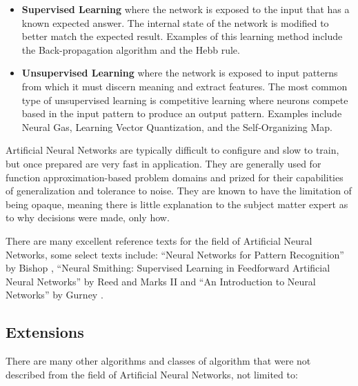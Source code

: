 \begin{bibunit}
\begin{itemize}
	\item \textbf{Supervised Learning} where the network is exposed to the input that has a known expected answer. The internal state of the network is modified to better match the expected result. Examples of this learning method include the Back-propagation algorithm and the Hebb rule.
	\item \textbf{Unsupervised Learning} where the network is exposed to input patterns from which it must discern meaning and extract features. The most common type of unsupervised learning is competitive learning where neurons compete based in the input pattern to produce an output pattern. Examples include Neural Gas, Learning Vector Quantization, and the Self-Organizing Map.
\end{itemize}

Artificial Neural Networks are typically difficult to configure and slow to train, but once prepared are very fast in application. They are generally used for function approximation-based problem domains and prized for their capabilities of generalization and tolerance to noise. They are known to have the limitation of being opaque, meaning there is little explanation to the subject matter expert as to why decisions were made, only how.



There are many excellent reference texts for the field of Artificial Neural Networks, some select texts include: ``Neural Networks for Pattern Recognition'' by Bishop \cite{Bishop1995}, ``Neural Smithing: Supervised Learning in Feedforward Artificial Neural Networks'' by Reed and Marks II \cite{Reed1999} and ``An Introduction to Neural Networks'' by Gurney \cite{Gurney1997}.


% 
% 
\subsection{Extensions}
There are many other algorithms and classes of algorithm that were not described from the field of Artificial Neural Networks, not limited to:


\end{bibunit}
